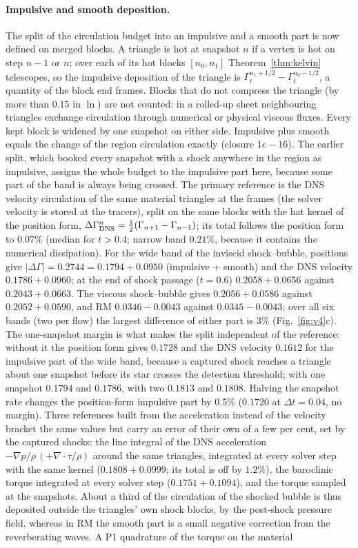 \documentclass[11pt]{article}
\theoremstyle{definition}\newtheorem{definition}{Definition}\theoremstyle{remark}\newtheorem{remark}{Remark}
\begin{document}
\paragraph{Impulsive and smooth deposition.} The split of the circulation budget into an impulsive and a smooth part is now defined on merged blocks. A triangle is hot at snapshot $n$ if a vertex is hot on step $n-1$ or $n$; over each of its hot blocks $[n_0,n_1]$ Theorem~\ref{thm:kelvin} telescopes, so the impulsive deposition of the triangle is $\Gamma_t^{n_1+1/2}-\Gamma_t^{n_0-1/2}$, a quantity of the block end frames. Blocks that do not compress the triangle (by more than $0.15$ in $\ln$) are not counted: in a rolled-up sheet neighbouring triangles exchange circulation through numerical or physical viscous fluxes. Every kept block is widened by one snapshot on either side. Impulsive plus smooth equals the change of the region circulation exactly (closure $1e-16$). The earlier split, which booked every snapshot with a shock anywhere in the region as impulsive, assigns the whole budget to the impulsive part here, because some part of the band is always being crossed. The primary reference is the DNS velocity circulation of the same material triangles at the frames (the solver velocity is stored at the tracers), split on the same blocks with the hat kernel of the position form, $\Delta\Gamma^n_{\rm DNS}=\tfrac12(\Gamma_{n+1}-\Gamma_{n-1})$; its total follows the position form to $0.07\%$ (median for $t>0.4$; narrow band $0.21\%$, because it contains the numerical dissipation). For the wide band of the inviscid shock--bubble, positions give $|\Delta\Gamma|=0.2744=0.1794+0.0950$ (impulsive + smooth) and the DNS velocity $0.1786+0.0960$; at the end of shock passage ($t=0.6$) $0.2058+0.0656$ against $0.2043+0.0663$. The viscous shock--bubble gives $0.2056+0.0586$ against $0.2052+0.0590$, and RM $0.0346-0.0043$ against $0.0345-0.0043$; over all six bands (two per flow) the largest difference of either part is $3\%$ (Fig.~\ref{fig:v4}c). The one-snapshot margin is what makes the split independent of the reference: without it the position form gives $0.1728$ and the DNS velocity $0.1612$ for the impulsive part of the wide band, because a captured shock reaches a triangle about one snapshot before its star crosses the detection threshold; with one snapshot $0.1794$ and $0.1786$, with two $0.1813$ and $0.1808$. Halving the snapshot rate changes the position-form impulsive part by $0.5\%$ ($0.1720$ at $\Delta t=0.04$, no margin). Three references built from the acceleration instead of the velocity bracket the same values but carry an error of their own of a few per cent, set by the captured shocks: the line integral of the DNS acceleration $-\nabla p/\rho\,(+\nabla\!\cdot\!\tau/\rho)$ around the same triangles, integrated at every solver step with the same kernel ($0.1808+0.0999$; its total is off by $1.2\%$), the baroclinic torque integrated at every solver step ($0.1751+0.1094$), and the torque sampled at the snapshots. About a third of the circulation of the shocked bubble is thus deposited outside the triangles' own shock blocks, by the post-shock pressure field, whereas in RM the smooth part is a small negative correction from the reverberating waves. A P1 quadrature of the torque on the material 
\end{document}
